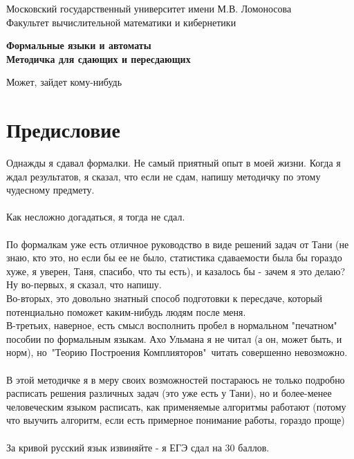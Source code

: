 \documentclass[14pt]{extreport}
\begin{document}
	\begin{titlepage}
		\begin{center}  
			\large{Московский государственный университет имени М.В. Ломоносова\\
			Факультет вычислительной математики и кибернетики}\\
		\end{center}
		\begin{center}
			\vspace{160pt}
			\LARGE{\textbf{Формальные языки и автоматы\\}}
			\LARGE{\textbf{Методичка для сдающих и пересдающих}}
			\vspace{320pt}
		\end{center}
		\begin{center}
			\large{Может, зайдет кому-нибудь}
		\end{center}
	\end{titlepage}
	\newpage
	\tableofcontents
	\newpage
	\chapter*{Предисловие}
		Однажды я сдавал формалки. Не самый приятный опыт в моей жизни. Когда я ждал результатов,
		я сказал, что если не сдам, напишу методичку по этому чудесному предмету.\\
		\\
		Как несложно догадаться, я тогда не сдал.
		\\\\
		По формалкам уже есть отличное руководство в виде решений задач от Тани (не знаю, кто это,
		но если бы ее не было, статистика сдаваемости была бы гораздо хуже, я уверен, Таня,
		спасибо, что ты есть), и казалось
		бы - зачем я это делаю?\\
		Ну во-первых, я сказал, что напишу.\\
		Во-вторых, это довольно знатный способ подготовки к пересдаче, который потенциально
		поможет каким-нибудь людям после меня.\\
		В-третьих, наверное, есть смысл восполнить пробел в нормальном "печатном" пособии по
		формальным языкам. Ахо Ульмана я не читал (а он, может быть, и норм), но\ "Теорию
		Построения Комплияторов"\ читать совершенно невозможно.
		\\\\
		В этой методичке я в меру своих возможностей постараюсь не только подробно
		расписать решения различных задач (это уже есть у Тани), но и более-менее человеческим
		языком расписать, как применяемые алгоритмы работают (потому что выучить алгоритм, если
		есть примерное понимание работы, гораздо проще)
		\\\\
		За кривой русский язык извиняйте - я ЕГЭ сдал на 30 баллов.
	\newpage
	
\end{document}
